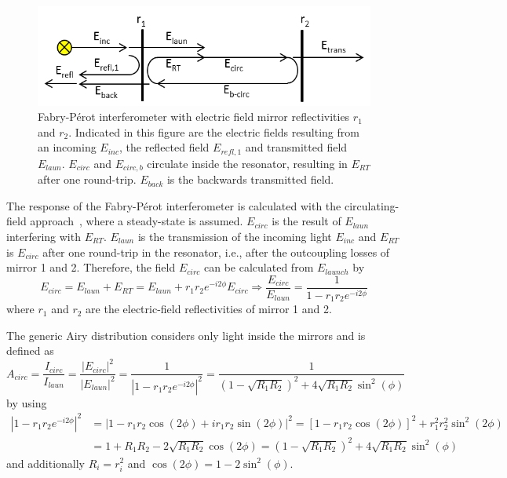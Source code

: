 \begin{figure}[h]
	\centering
	\includegraphics[width=0.7\linewidth]{figures/fabry-perot/Schematic_of_the_Fabry-Perot_interferometer}
	\caption[Fabry-Pérot interferometer with electric field mirror reflectivities $r_1$ and $r_2$]{Fabry-Pérot interferometer with electric field mirror reflectivities $r_1$ and $r_2$. Indicated in this figure are the electric fields resulting from an incoming $E_{inc}$, the reflected field $E_{refl,1}$ and transmitted field $E_{laun}$. $E_{circ}$ and $E_{circ,b}$ circulate inside the resonator, resulting in $E_{RT}$ after one round-trip. $E_{back}$ is the backwards transmitted field.\cite{noauthor_fabryperot_nodate}}
	\label{fig:schematicofthefabry-perotinterferometer}
\end{figure}
The response of the Fabry-Pérot interferometer is calculated with the circulating-field approach~\cite{ismail_fabry-perot_2016}, where a steady-state is assumed.
$E_{circ}$ is the result of $E_{laun}$ interfering with $E_{RT}$.
$E_{laun}$ is the transmission of the incoming light $E_{inc}$ and $E_{RT}$ is $E_{circ}$ after one round-trip in the resonator, i.e., after the outcoupling losses of mirror 1 and 2.
Therefore, the field $E_{circ}$ can be calculated from $E_{launch}$ by
\begin{equation}
E_{circ} = E_{laun} + E_{RT} = E_{laun} + r_1 r_2 e^{-i 2 \phi} E_{circ} \Rightarrow \frac{E_{circ}}{E_{laun}} = \frac{1}{1 - r_1 r_2 e^{-i 2 \phi}}
\end{equation}
where $r_1$ and $r_2$ are the electric-field reflectivities of mirror 1 and 2.

The generic Airy distribution considers only light inside the mirrors and is defined as
\begin{equation}
A_{circ} = \frac{I_{circ}}{I_{laun}} = \frac{|E_{circ}|^2}{|E_{laun}|^2} = \frac{1}{\left|1 - r_1 r_2 e^{-i2\phi}\right|^2} = \frac{1}{\left(1-\sqrt{R_1 R_2}\right)^2 + 4\sqrt{R_1 R_2} \sin^2(\phi)}
\end{equation}
by using
\begin{align*}
\left|1-r_1 r_2 e^{-i2\phi}\right|^2 &= \left|1- r_1 r_2 \cos(2\phi) + i r_1 r_2 \sin(2\phi)\right|^2 = \left[1-r_1 r_2 \cos(2\phi)\right]^2 + r_1^2 r_2^2 \sin^2(2\phi) \\
 &=1+R_1 R_2 - 2\sqrt{R_1 R_2} \cos(2\phi) = \left(1-\sqrt{R_1 R_2}\right)^2 + 4 \sqrt{R_1 R_2} \sin^2(\phi)
\end{align*}
and additionally $R_i = r_i^2$ and $\cos(2\phi) = 1 -2\sin^2(\phi)$.

